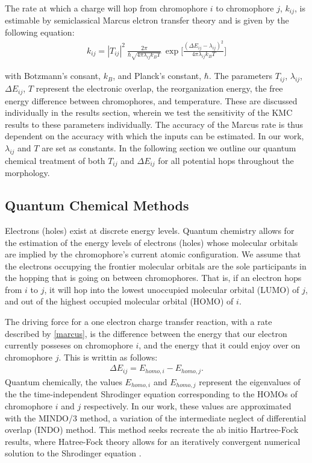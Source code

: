 The rate at which a charge will hop from chromophore $i$ to chromophore $j$, $k_{ij}$,
is estimable by semiclassical Marcus elctron transfer theory and is given by the following equation:
\begin{align}
    k_{ij}  =  |T_{ij}|^2\ \frac{2\pi}{\hbar \sqrt{4 \pi \lambda_{ij} k_{B} T}}\ \exp{\Bigg[ \frac{(\Delta
    E_{ij} - \lambda_{ij})^2}{ 4 \pi \lambda_{ij} k_{B} T} \Bigg] }
    \label{marcus}
\end{align}

with Botzmann's consant, $k_{B}$, and Planck's constant, $\hbar$. The parameters $T_{ij}$, $\lambda_{ij}$,
$\Delta E_{ij}$, $T$ represent the electronic overlap, the reorganization energy, the free energy difference
between chromophores, and
temperature. These are discussed individually in the results section, wherein we test the sensitivity of
the KMC results to these parameters individually.
The accuracy of the Marcus rate is thus dependent on the accuracy with which the inputs can be estimated. In
our work, $\lambda_{ij}$ and $T$ are set as constants. In
the following section we outline our quantum chemical treatment of both $T_{ij}$ and $\Delta E_{ij}$ for all
potential hops throughout the morphology.

\subsection{Quantum Chemical Methods}
Electrons (holes) exist at discrete energy levels.
Quantum chemistry allows for the estimation of the energy levels of electrons (holes) whose
molecular orbitals are implied by the chromophore's current atomic configuration.
We assume that the electrons occupying the frontier molecular orbitals are the sole participants in the
hopping that is going on between chromophores. That is, if an electron hops from $i$ to $j$, it will hop
into the lowest unoccupied molecular orbital (LUMO) of $j$, and out of the
highest occupied molecular orbital (HOMO) of $i$.  

The driving force for a one electron charge transfer reaction, 
with a rate described by \autoref{marcus}, is the difference between the energy that our electron 
currently posseses 
on chromophore $i$, and the energy that it could enjoy over on chromophore $j$. 
This is writtin as follows:
\begin{align}
    \Delta E_{ij} = E_{homo, i} - E_{homo, j}.
    \label{gibbs}
\end{align}
Quantum chemically, the values $E_{homo, i}$ and $E_{homo, j}$ represent the eigenvalues of the the
time-independent Shrodinger equation corresponding to the HOMOs of chromophore $i$ and $j$ respectively. 
In our work, these values are approximated with the MINDO/3 method, a variation of the intermediate neglect of 
differential overlap (INDO) method. This method seeks recreate the ab initio Hartree-Fock
results, where Hatree-Fock theory allows for an iteratively convergent numerical solution to the
Shrodinger equation \cite{Thiel2014}. 

